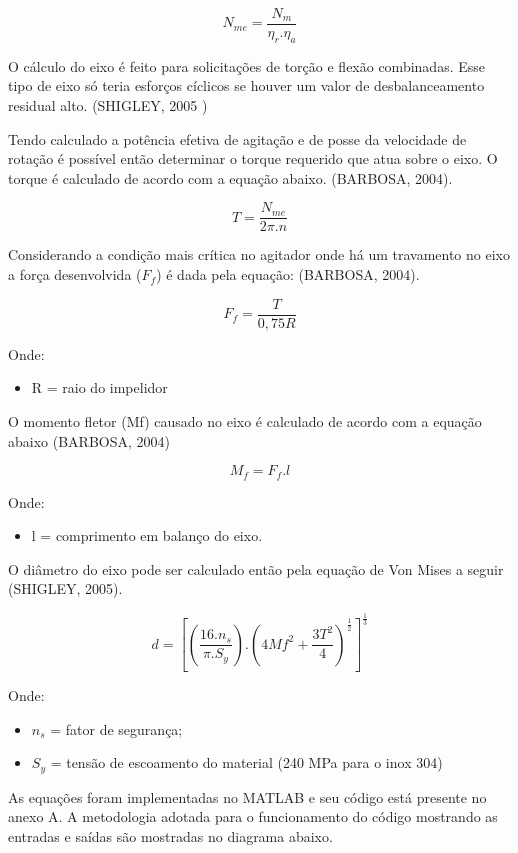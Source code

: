 \[N_{me}=\frac{N_{m}}{\eta_r.\eta_a}\]


O cálculo do eixo é feito para solicitações de torção e flexão combinadas. Esse tipo de eixo só teria esforços cíclicos se houver um valor de desbalanceamento residual alto. (SHIGLEY, 2005 )

Tendo calculado a potência efetiva de agitação e de posse da velocidade de rotação é possível então determinar o torque requerido que atua sobre o eixo. O torque é calculado de acordo com a equação abaixo. (BARBOSA, 2004).

\[T=\frac{N_{me}}{2\pi.n}\]

Considerando a condição mais crítica no agitador onde há um travamento no eixo a força desenvolvida (\(F_f\)) é dada pela equação: (BARBOSA, 2004).

\[F_f=\frac{T}{0,75R}\]

Onde:

\begin{itemize}
	\item R = raio do impelidor
\end{itemize}

O momento fletor (Mf) causado no eixo é calculado de acordo com a equação abaixo (BARBOSA, 2004)

\[M_{f}=F_{f}.l\]

Onde:
\begin{itemize}
	\item l = comprimento em balanço do eixo.
\end{itemize}

O diâmetro do eixo pode ser calculado então pela equação de Von Mises a seguir (SHIGLEY, 2005).

\[d=\left[\left(\frac{16.n_s}{\pi.S_y}\right).\left(4Mf^2+\frac{3T^2}{4}\right)^\frac{1}{2}\right]^\frac{1}{3}\]

Onde:
\begin{itemize}
	\item \(n_{s}\) = fator de segurança;
	\item \(S_{y}\) = tensão de escoamento do material (240 MPa para o inox 304)
\end{itemize}

As equações foram implementadas no MATLAB e seu código está presente no anexo A. A metodologia adotada para o funcionamento do código mostrando as entradas e saídas são mostradas no diagrama abaixo.

